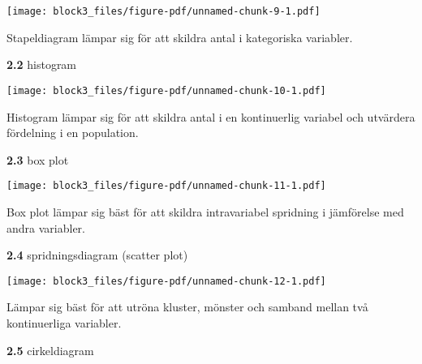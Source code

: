 \documentclass[
  letterpaper,
  DIV=11,
  numbers=noendperiod]{scrartcl}
\newenvironment{Shaded}{\begin{snugshade}}{\end{snugshade}}
\newcommand{\FunctionTok}[1]{\textcolor[rgb]{0.28,0.35,0.67}{#1}}
\newcommand{\NormalTok}[1]{\textcolor[rgb]{0.00,0.23,0.31}{#1}}
\newcommand{\SpecialCharTok}[1]{\textcolor[rgb]{0.37,0.37,0.37}{#1}}
\begin{document}
\texttt{[image: block3\_files/figure-pdf/unnamed-chunk-9-1.pdf]}

Stapeldiagram lämpar sig för att skildra antal i kategoriska variabler.

\textbf{2.2} histogram

\begin{Shaded}
\end{Shaded}

\texttt{[image: block3\_files/figure-pdf/unnamed-chunk-10-1.pdf]}

Histogram lämpar sig för att skildra antal i en kontinuerlig variabel
och utvärdera fördelning i en population.

\textbf{2.3} box plot

\begin{Shaded}
\end{Shaded}

\texttt{[image: block3\_files/figure-pdf/unnamed-chunk-11-1.pdf]}

Box plot lämpar sig bäst för att skildra intravariabel spridning i
jämförelse med andra variabler.

\textbf{2.4} spridningsdiagram (scatter plot)

\begin{Shaded}
\end{Shaded}

\texttt{[image: block3\_files/figure-pdf/unnamed-chunk-12-1.pdf]}

Lämpar sig bäst för att utröna kluster, mönster och samband mellan två
kontinuerliga variabler.

\textbf{2.5} cirkeldiagram

\begin{Shaded}
\end{Shaded}
\end{document}
